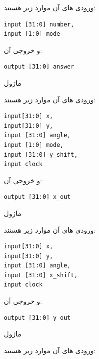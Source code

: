 \documentclass[12pt,titlepage,a4page , tikz , multi,table , svgnames,xcdraw]{article}
\begin{document}
 ورودی های آن موارد زیر هستند:

\begin{latin}
\begin{verbatim}
input [31:0] number,
input [1:0] mode
\end{verbatim}
\end{latin}

و خروجی آن:

\begin{latin}
\begin{verbatim}
output [31:0] answer
\end{verbatim}
\end{latin}

\hrulefill


ماژول  

 
 ورودی های آن موارد زیر هستند:

\begin{latin}
\begin{verbatim}
input[31:0] x,
input[31:0] y,
input [31:0] angle,
input [1:0] mode,
input [31:0] y_shift,
input clock
\end{verbatim}
\end{latin}

و خروجی آن:

\begin{latin}
\begin{verbatim}
output [31:0] x_out
\end{verbatim}
\end{latin}


\hrulefill
 

ماژول  
 
 ورودی های آن موارد زیر هستند:

\begin{latin}
\begin{verbatim}
input[31:0] x,
input[31:0] y,
input [31:0] angle,
input [31:0] x_shift,
input clock
\end{verbatim}
\end{latin}

و خروجی آن:

\begin{latin}
\begin{verbatim}
output [31:0] y_out
\end{verbatim}
\end{latin}


\hrulefill


ماژول 

 
 ورودی های آن موارد زیر هستند:
\end{document}

